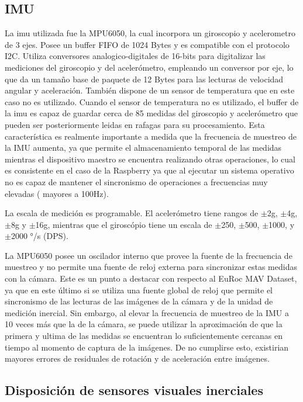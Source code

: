 

\subsection{IMU}

La imu utilizada fue la MPU6050, la cual incorpora un giroscopio y acelerometro de 3 ejes. Posee un buffer FIFO de 1024 Bytes y es compatible con el protocolo  I2C. Utiliza conversores analogico-digitales de 16-bits para digitalizar las mediciones del giroscopio y del acelerómetro, empleando un conversor por eje, lo que da un tamaño base de paquete de 12 Bytes para las lecturas de velocidad angular y aceleración. También dispone de un sensor de temperatura que en este caso no es utilizado. 
Cuando el sensor de temperatura no es utilizado, el buffer de la imu es capaz de guardar cerca de 85 medidas del giroscopio y acelerómetro que pueden ser posteriormente leidas en rafagas para su procesamiento. Esta característica es realmente importante a medida que la frecuencia de muestreo de la IMU aumenta, ya que permite el almacenamiento temporal de las medidas mientras el dispositivo maestro se encuentra realizando otras operaciones, lo cual es consistente en el caso de la Raspberry ya que al ejecutar un sistema operativo no es capaz de mantener el sincronismo de operaciones a frecuencias muy elevadas ( mayores a 100Hz).

La escala de medición es programable. El acelerómetro tiene rangos de $\pm$2g, $\pm$4g, $\pm$8g y $\pm$16g, mientras que el giroscópio tiene un escala de $\pm$250, $\pm$500, $\pm$1000, y $\pm$2000 °/s (DPS).

La MPU6050 posee un oscilador interno que provee la fuente de la frecuencia de muestreo y no permite una fuente de reloj externa para sincronizar estas medidas con la cámara. Este es un punto a destacar con respecto al EuRoc MAV Dataset, ya que en este último si se utiliza una fuente global de reloj que permite el sincronismo de las lecturas de las imágenes de la cámara y de la unidad de medición inercial. Sin embargo, al elevar la frecuencia de muestreo de la IMU a 10 veces más que la de la cámara, se puede utilizar la aproximación de que la primera y ultima de las medidas se encuentran lo suficientemente cercanas en tiempo al momento de captura de la imágenes. De no cumplirse esto, existirian mayores errores de residuales de rotación y de aceleración  entre imágenes.
 

\subsection{Disposición de sensores visuales inerciales}

